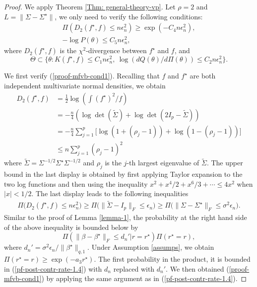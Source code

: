 \documentclass[pdftex, noinfoline, letter]{imsart}
\theoremstyle{plain}
\begin{document}
\begin{proof}
We apply Theorem \ref{Thm: general-theory-vp}.
Let $\rho = 2$ and $L = \|\Sigma - \Sigma^\star\|$, we only need to verify the following conditions:
\begin{eqnarray}
& \Pi(D_2(f^\star, f) \leq n\epsilon_n^2) \geq \exp(-C_4n\epsilon_n^2), &
\label{proof-mfvb-cond1}\\
&  - \log P(\theta) \leq C_5n\epsilon_n^2, &
\label{proof-mfvb-cond2}
\end{eqnarray}
where  $D_2(f^\star, f)$ is the $\chi^2$-divergence between $f^\star$ and $f$, and 
$$\Theta \subset \Big\{
\theta: K(f^\star, f) \leq C_1n\epsilon_n^2, \
\log \left(dQ(\theta)/d\Pi(\theta)\right) \leq C_2 n\epsilon_n^2
\Big\}.$$

We first verify (\ref{proof-mfvb-cond1}).
Recalling that $f$ and $f^\star$ are both independent multivariate normal densities, we obtain
\begin{align*}
    D_2(f^\star, f) & 
    =\frac{1}{2} \log\left(
    \int {(f^\star)^2}/{f} \right)\\
    &= -\frac{n}{4}
    \left(
        \log \det(\widetilde \Sigma) + 
        \log \det \left(2I_p - \widetilde \Sigma\right)
    \right)\\
    & = 
    -\frac{n}{4} \sum_{j=1}^p
    \Big[
        \log (1+(\rho_j-1))  + \log (1-(\rho_j - 1))
    \Big] \\
    & \leq n \sum_{j=1}^p (\rho_j-1)^2
\end{align*}
where $\widetilde\Sigma = \Sigma^{-1/2}\Sigma^\star \Sigma^{-1/2}$
and $\rho_j$ is the $j$-th largest eigenvalue of $\widetilde\Sigma$.
The upper bound in the last display is obtained by first applying Taylor expansion to the two log functions and then using the inequality 
$x^2 + x^4/2 + x^6/3 + \cdots \leq 4x^2$ when $|x| < 1/2$.
The last display leads to the following inequalities
\begin{align*}
\Pi\big(D_2(f^\star, f) \leq n\epsilon_n^2\big) 
\geq \Pi\big(\|\widetilde \Sigma - I_p\|_F \leq \epsilon_n\big)
\geq \Pi\big(\|\Sigma - \Sigma^\star\|_F \leq \sigma^2 \epsilon_n\big).
\end{align*}
Similar to the proof of Lemma \ref{lemma-1}, the probability at the right hand side of the above inequality is bounded below by
$$\Pi(\|\beta - \beta^\star\|_F \leq d_n' \big| r=r^\star) \Pi(r^\star = r),$$
where $d_n' = \sigma^2\epsilon_n/\|\beta^\star\|_{q,1}$.
Under Assumption \ref{assumps}, we obtain $\Pi(r^\star = r) \geq \exp(-a_3 r^\star)$.
The first probability in the product, it is bounded in
(\ref{pf-post-contr-rate-1.4}) with $d_n$ replaced with $d_n'$.
We then obtained (\ref{proof-mfvb-cond1}) by applying the same argument as in (\ref{pf-post-contr-rate-1.4}).



\end{proof}
\end{document}
